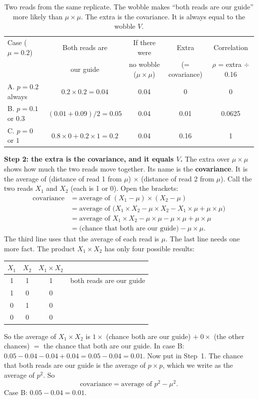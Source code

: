 \begin{table}[ht]
\centering
\small
\renewcommand{\arraystretch}{1.35}\setlength{\tabcolsep}{4pt}
\begin{tabular}{@{}lcccc@{}}
\toprule
Case ($\mu = 0.2$) & Both reads are & If there were & Extra & Correlation\\
& our guide & no wobble ($\mu \times \mu$) & (= covariance) & $\rho$ = extra $\div$ 0.16\\
\midrule
A. $p = 0.2$ always & $0.2 \times 0.2 = 0.04$ & 0.04 & 0 & 0\\
B. $p = 0.1$ or $0.3$ & $(0.01 + 0.09)/2 = 0.05$ & 0.04 & 0.01 & 0.0625\\
C. $p = 0$ or $1$ & $0.8 \times 0 + 0.2 \times 1 = 0.2$ & 0.04 & 0.16 & 1\\
\bottomrule
\end{tabular}
\caption{Two reads from the same replicate. The wobble makes ``both reads
are our guide'' more likely than $\mu \times \mu$. The extra is the
covariance. It is always equal to the wobble $V$.}
\label{tab:both}
\end{table}

\textbf{Step 2: the extra is the covariance, and it equals $V$.} The extra
over $\mu \times \mu$ shows how much the two reads move together. Its name
is the \textbf{covariance}. It is the average of (distance of read 1 from
$\mu$) $\times$ (distance of read 2 from $\mu$). Call the two reads $X_1$
and $X_2$ (each is 1 or 0). Open the brackets:
\begin{align*}
\text{covariance} &= \text{average of } (X_1 - \mu) \times (X_2 - \mu)\\
&= \text{average of } \bigl(X_1 \times X_2 - \mu \times X_2 - X_1 \times \mu + \mu \times \mu\bigr)\\
&= \text{average of } X_1 \times X_2 - \mu \times \mu - \mu \times \mu + \mu \times \mu\\
&= \text{(chance that both are our guide)} - \mu \times \mu .
\end{align*}
The third line uses that the average of each read is $\mu$. The last line
needs one more fact. The product $X_1 \times X_2$ has only four possible
results:

\begin{center}
\small
\begin{tabular}{@{}cccl@{}}
\toprule
$X_1$ & $X_2$ & $X_1 \times X_2$ & \\
\midrule
1 & 1 & 1 & both reads are our guide\\
1 & 0 & 0 & \\
0 & 1 & 0 & \\
0 & 0 & 0 & \\
\bottomrule
\end{tabular}
\end{center}
So the average of $X_1 \times X_2$ is $1 \times$ (chance both are our guide)
$+\; 0 \times$ (the other chances) $=$ the chance that both are our guide.
In case B: $0.05 - 0.04 - 0.04 + 0.04 = 0.05 - 0.04 = 0.01$.
Now put in Step~1. The chance that both reads are our guide is the average
of $p \times p$, which we write as the average of $p^2$. So
\[
\text{covariance} = \text{average of } p^2 - \mu^2 .
\]
Case B: $0.05 - 0.04 = 0.01$.

